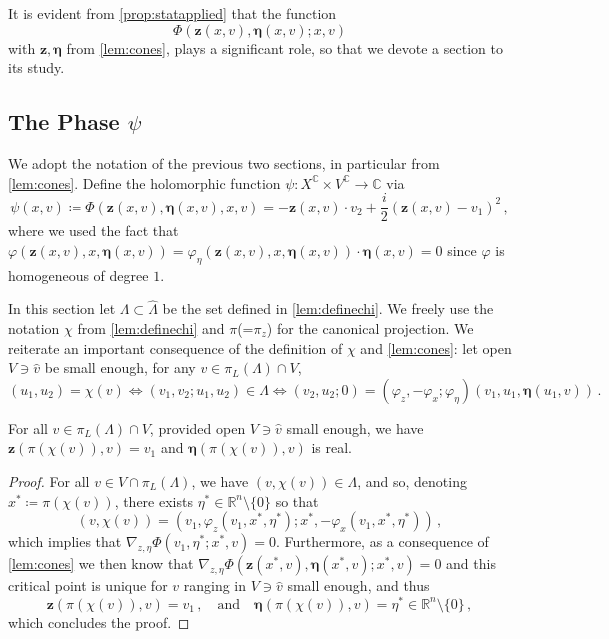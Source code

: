\documentclass[
	fontsize=11pt, 
	twoside=false, 
	abstract=true, 
	a4paper,
]{scrartcl}
\newcommand{\sem}{\setminus\{0\}}
\newcommand{\RR}{\mathbb{R}}
\newcommand{\CC}{\mathbb{C}}
\newcommand{\an}{\quad\text{and}\quad}
\begin{document}
It is evident from \cref{prop:statapplied} that the function
\[
	\Phi(\mathbf{z}(x,v),\bm{\eta}(x,v);x,v)
\]
with $\mathbf{z},\bm{\eta}$ from \cref{lem:cones}, plays a significant role, so that we devote a section to its study. 

\subsection{The Phase $\psi$}\label{sec:psi} %

We adopt the notation of the previous two sections, in particular from \cref{lem:cones}. Define the holomorphic function $\psi \colon X^{\CC}\times V^{\CC}\to \CC$ via
\begin{equation}\label{eq:defpsi}
	\psi(x,v) \coloneqq \Phi(\mathbf{z}(x,v), \bm{\eta}(x,v),x,v) = -\mathbf{z}(x,v)\cdot v_2 + \frac{i}{2}(\mathbf{z}(x,v)-v_1)^2\,,
\end{equation}
where we used the fact that $\varphi(\mathbf{z}(x,v),x,\bm{\eta}(x,v)) = \varphi_\eta(\mathbf{z}(x,v),x,\bm{\eta}(x,v))\cdot \bm{\eta}(x,v) = 0$ since $\varphi$ is homogeneous of degree $1$.

In this section let $\Lambda \subset \hat\Lambda$ be the set defined in \cref{lem:definechi}. We freely use the notation $\chi$ from \cref{lem:definechi} and $\pi$(=$\pi_z$) for the canonical projection. We reiterate an important consequence of the definition of $\chi$ and \cref{lem:cones}: let open $V\ni \hat v$ be small enough, for any $v\in\pi_L(\Lambda) \cap V$,
\begin{equation}\label{eq:chiprops}
	(u_1,u_2) = \chi(v) \iff (v_1,v_2; u_1,u_2) \in \Lambda \iff (v_2,u_2;0) = (\varphi_z,-\varphi_x;\varphi_\eta)(v_1,u_1,\bm{\eta}(u_1,v))\,.
\end{equation}

\begin{lemma}\label{lem:v1}
	For all $v\in \pi_L(\Lambda)\cap V$, provided open $V\ni \hat v$ small enough, we have $\mathbf{z}(\pi(\chi(v)),v) = v_1$ and $\bm{\eta}(\pi(\chi(v)),v)$ is real.
\end{lemma}
\begin{proof}
	For all $v \in V \cap \pi_L(\Lambda)$, we have $(v,\chi(v)) \in \Lambda$, and so, denoting $x^\ast\coloneqq \pi(\chi(v))$, there exists $\eta^\ast \in \RR^n\sem$ so that
	\[
		(v,\chi(v)) = (v_1, \varphi_z(v_1,x^\ast,\eta^\ast);x^\ast,-\varphi_x(v_1,x^\ast,\eta^\ast))\,,
	\]
	which implies that $\nabla_{z,\eta}\Phi(v_1,\eta^\ast; x^\ast,v) = 0$. Furthermore, as a consequence of \cref{lem:cones} we then know that $\nabla_{z,\eta}\Phi(\mathbf{z}(x^\ast,v),\bm{\eta}(x^\ast,v);x^\ast,v) = 0$ and this critical point is unique for $v$ ranging in $V\ni \hat v$ small enough, and thus
	\[
		\mathbf{z}(\pi(\chi(v)),v) = v_1\,,\an \bm{\eta}(\pi(\chi(v)),v) = \eta^\ast \in \RR^n\sem\,,
	\]
	which concludes the proof.
\end{proof}
\end{document}
